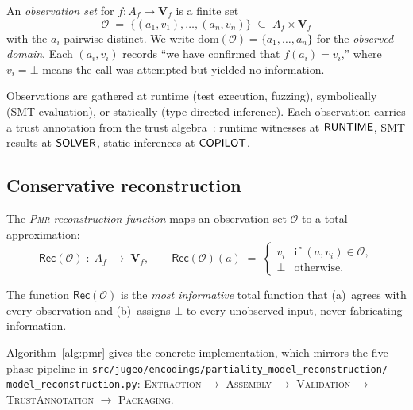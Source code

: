 \documentclass[11pt]{article}
\newcommand{\pdom}{\mathrm{dom}}             %
\newcommand{\PMR}{\textsc{Pmr}}            %
\newcommand{\ObsSet}{\mathcal{O}}          %
\newcommand{\RecAlg}{\mathsf{Rec}}         %
\newcommand{\PVal}{\mathbf{V}}             %
\begin{document}
\begin{definition}\label{def:obs}
An \emph{observation set} for $f : A_f \to \PVal_f$ is a finite set
\[
  \ObsSet \;=\; \{(a_1, v_1), \ldots, (a_n, v_n)\}
  \;\subseteq\; A_f \times \PVal_f
\]
with the $a_i$ pairwise distinct.  We write
$\pdom(\ObsSet) = \{a_1, \ldots, a_n\}$ for the \emph{observed
domain}.  Each $(a_i, v_i)$ records ``we have confirmed that
$f(a_i) = v_i$,'' where $v_i = \bot$ means the call was attempted but
yielded no information.
\end{definition}

Observations are gathered at runtime (test execution, fuzzing),
symbolically (SMT evaluation), or statically (type-directed inference).
Each observation carries a trust annotation from the \JuGeo{} trust
algebra~\cite{jugeo04}: runtime witnesses at $\mathsf{RUNTIME}{}$, SMT results
at $\mathsf{SOLVER}{}$, static inferences at $\mathsf{COPILOT}{}$.

\subsection{Conservative reconstruction}

\begin{definition}\label{def:rec}
The \emph{\PMR{} reconstruction function} maps an observation set
$\ObsSet$ to a total approximation:
\[
  \RecAlg(\ObsSet) \;:\; A_f \;\to\; \PVal_f,
  \qquad
  \RecAlg(\ObsSet)(a)
  \;=\;
  \begin{cases}
    v_i & \text{if } (a, v_i) \in \ObsSet, \\
    \bot & \text{otherwise.}
  \end{cases}
\]
\end{definition}

The function $\RecAlg(\ObsSet)$ is the \emph{most informative} total
function that (a)~agrees with every observation and (b)~assigns $\bot$
to every unobserved input, never fabricating information.

Algorithm~\ref{alg:pmr} gives the concrete implementation, which
mirrors the five-phase pipeline in
\texttt{src/jugeo/encodings/partiality\_model\_reconstruction/%
model\_reconstruction.py}:
\textsc{Extraction} $\to$
\textsc{Assembly} $\to$
\textsc{Validation} $\to$
\textsc{TrustAnnotation} $\to$
\textsc{Packaging}.
\end{document}
